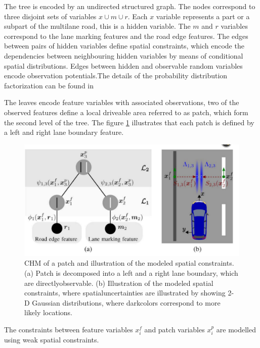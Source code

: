 \documentclass[conference]{IEEEtran}
\begin{document}
The tree is encoded by an undirected structured graph. The nodes correspond to three disjoint sets of variables $x \cup m \cup r$.  Each $x$ variable represents a part or a subpart of the multilane road, this is a hidden variable. The $m$ and $r$ variables correspond to the lane marking features and the road edge features. The edges between pairs of hidden variables define spatial constraints, which encode the dependencies between neighbouring hidden variables by means of conditional spatial distributions. Edges between hidden and observable random variables encode observation potentials.The details of the probability distribution factorization can be found in \cite{lanesystem}

The leaves encode feature variables with associated observations, two of the observed features define a local driveable area referred to as patch, which form the second level of the tree. The figure \ref{fig11} illustrates that each patch is defined by a left and right lane boundary feature.

\begin{figure}[H]
	\centering
    \includegraphics[scale = 0.4]{pictures/patch.pdf}
	\caption{CHM of a patch and illustration of the modeled spatial constraints.(a) Patch is decomposed into a left and a right lane boundary, which are directlyobservable. (b) Illustration of the modeled spatial constraints, where spatialuncertainties are illustrated by showing 2-D Gaussian distributions, where darkcolors correspond to more likely locations.\cite{lanesystem}}
	\label{fig11}
\end{figure}

The constraints between feature variables $x^f_i$ and patch variables $x^p_i$ are modelled using weak spatial constraints. 
\end{document}
